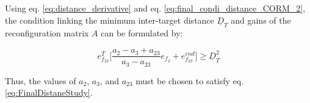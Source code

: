 Using  eq. \ref{eq:distance_derivative} and eq. \ref{eq:final_condi_distance_CORM_2}, the condition linking the minimum inter-target distance $\underline{D}_{T}$ and gains of the reconfiguration matrix $A$ can be formulated by: 

\begin{equation}\label{eq:FinalDistaneStudy}
    e_{f_{23}}^T \Big[\frac{a_2-a_3+a_{23}}{a_3-a_{23}}{e}_{f_2} + {e}_{f_{23}}^{end} \Big] \geq \underline{D}_{T} ^2 
\end{equation}

Thus, the values of $a_2$, $a_3$, and $a_{23}$ must be chosen to satisfy eq. \ref{eq:FinalDistaneStudy}.
